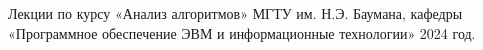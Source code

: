 \begin{thebibliography}{}
   Лекции по курсу «Анализ алгоритмов» МГТУ им. Н.Э. Баумана, кафедры «Программное обеспечение ЭВМ и информационные технологии» 2024 год.
\end{thebibliography}